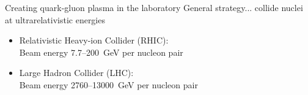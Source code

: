 \documentclass[xcolor=dvipsnames, aspectratio=169]{beamer}
\begin{document}
\begin{frame}[t]{Creating quark-gluon plasma in the laboratory}
\bigskip
General strategy... collide nuclei at ultrarelativistic energies
\medskip
\begin{itemize}
    \item Relativistic Heavy-ion Collider (RHIC):\\
          Beam energy 7.7--200~GeV per nucleon pair
    \item Large Hadron Collider (LHC):\\
          Beam energy 2760--13000~GeV per nucleon pair
\end{itemize}
\vspace{-.3cm}
\begin{columns}[T]
    \begin{column}{0.05\textwidth}
    \end{column}
    \begin{column}{0.9\textwidth}
\end{column}
\end{columns}
\end{frame}
\end{document}
